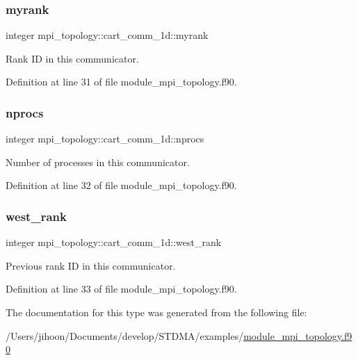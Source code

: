 \subsubsection{\texorpdfstring{myrank}{myrank}}
{\footnotesize\ttfamily integer mpi\+\_\+topology\+::cart\+\_\+comm\+\_\+1d\+::myrank}



Rank ID in this communicator. 



Definition at line 31 of file module\+\_\+mpi\+\_\+topology.\+f90.

\mbox{\label{structmpi__topology_1_1cart__comm__1d_adf78d1be6ca59cada6cc444edde4c3fc}} 
\subsubsection{\texorpdfstring{nprocs}{nprocs}}
{\footnotesize\ttfamily integer mpi\+\_\+topology\+::cart\+\_\+comm\+\_\+1d\+::nprocs}



Number of processes in this communicator. 



Definition at line 32 of file module\+\_\+mpi\+\_\+topology.\+f90.

\mbox{\label{structmpi__topology_1_1cart__comm__1d_a63baa1f74126ffda0b67af1c487dcd45}} 
\subsubsection{\texorpdfstring{west\_rank}{west\_rank}}
{\footnotesize\ttfamily integer mpi\+\_\+topology\+::cart\+\_\+comm\+\_\+1d\+::west\+\_\+rank}



Previous rank ID in this communicator. 



Definition at line 33 of file module\+\_\+mpi\+\_\+topology.\+f90.



The documentation for this type was generated from the following file\+:\begin{DoxyCompactItemize}
\item 
/\+Users/jihoon/\+Documents/develop/\+S\+T\+D\+M\+A/examples/\mbox{\hyperlink{module__mpi__topology_8f90}{module\+\_\+mpi\+\_\+topology.\+f90}}\end{DoxyCompactItemize}
